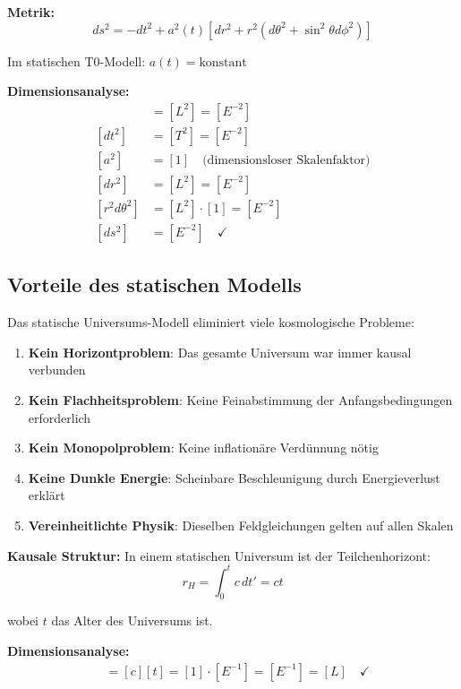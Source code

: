 \documentclass[12pt,a4paper]{report}
\begin{document}
	\textbf{Metrik:}
	\begin{equation}
		ds^2 = -dt^2 + a^2(t)[dr^2 + r^2(d\theta^2 + \sin^2\theta d\phi^2)]
	\end{equation}
	
	Im statischen T0-Modell: $a(t) = \text{konstant}$
	
	\textbf{Dimensionsanalyse:}
	\begin{align}
		[ds^2] &= [L^2] = [E^{-2}] \\
		[dt^2] &= [T^2] = [E^{-2}] \\
		[a^2] &= [1] \quad \text{(dimensionsloser Skalenfaktor)} \\
		[dr^2] &= [L^2] = [E^{-2}] \\
		[r^2 d\theta^2] &= [L^2] \cdot [1] = [E^{-2}] \\
		[ds^2] &= [E^{-2}] \quad \checkmark
	\end{align}
	
	\subsection{Vorteile des statischen Modells}
	\label{subsec:advantages_static}
	
	Das statische Universums-Modell eliminiert viele kosmologische Probleme:
	\begin{enumerate}
		\item \textbf{Kein Horizontproblem}: Das gesamte Universum war immer kausal verbunden
		\item \textbf{Kein Flachheitsproblem}: Keine Feinabstimmung der Anfangsbedingungen erforderlich
		\item \textbf{Kein Monopolproblem}: Keine inflationäre Verdünnung nötig
		\item \textbf{Keine Dunkle Energie}: Scheinbare Beschleunigung durch Energieverlust erklärt
		\item \textbf{Vereinheitlichte Physik}: Dieselben Feldgleichungen gelten auf allen Skalen
	\end{enumerate}
	
	\textbf{Kausale Struktur:}
	In einem statischen Universum ist der Teilchenhorizont:
	\begin{equation}
		r_H = \int_0^t c \, dt' = ct
	\end{equation}
	
	wobei $t$ das Alter des Universums ist.
	
	\textbf{Dimensionsanalyse:}
	\begin{align}
		[r_H] &= [c][t] = [1] \cdot [E^{-1}] = [E^{-1}] = [L] \quad \checkmark
	\end{align}
	
\end{document}
